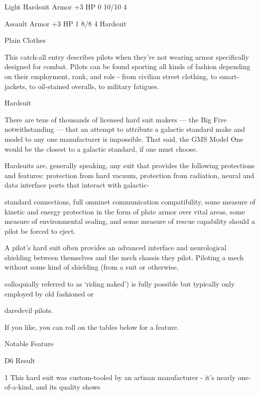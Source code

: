     Light Hardsuit      Armor               +3 HP                                0            10/10            4

    Assault             Armor               +3 HP                                1            8/8              4
    Hardsuit

                                                     Plain Clothes

This catch-all entry describes pilots when they’re not wearing armor specifically designed for
combat. Pilots can be found sporting all kinds of fashion depending on their employment, rank,
and role - from civilian street clothing, to smart-jackets, to oil-stained overalls, to military
fatigues.





                                                         Hardsuit

There are tens of thousands of licensed hard suit makers — the Big Five notwithstanding — that an attempt
to attribute a galactic standard make and model to any one manufacturer is impossible. That said, the GMS
Model One would be the closest to a galactic standard, if one must choose.

Hardsuits are, generally speaking, any suit that provides the following protections and features: protection
from hard vacuum, protection from radiation, neural and data interface ports that interact with galactic-

standard connections, full omninet communication compatibility, some measure of kinetic and energy
protection in the form of plate armor over vital areas, some measure of environmental sealing, and some
measure of rescue capability should a pilot be forced to eject.

A pilot’s hard suit often provides an advanced interface and neurological shielding between themselves and
the mech chassis they pilot. Piloting a mech without some kind of shielding (from a suit or otherwise,

colloquially referred to as ‘riding naked’) is fully possible but typically only employed by old fashioned or

daredevil pilots.

If you like, you can roll on the tables below for a feature.


                                                       Notable Feature


  D6     Result

  1      This hard suit was custom-tooled by an artisan manufacturer - it’s nearly one-of-a-kind, and its quality shows

